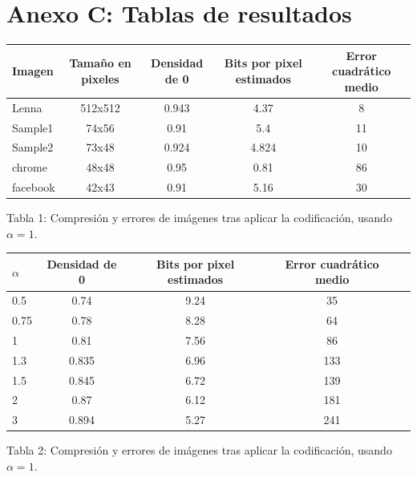 \documentclass[%
final,
%
reprint,
%
notitlepage,
narroweqnarray,
inline,
twoside,
invited
]{ieee}
\begin{document}

\section*{Anexo C: Tablas de resultados}

\begin{center}
	\begin{tabular}{|l || c | c | c | c|}
		\hline
		\textbf{Imagen} & \textbf{Tamaño en pixeles} & \textbf{Densidad de 0} & \textbf{Bits por pixel estimados} & \textbf{Error cuadrático medio}\\
		\hline
		\hline
		Lenna & 512x512 & 0.943 & 4.37 & 8\\
		Sample1 & 74x56 & 0.91 & 5.4 & 11\\
		Sample2 & 73x48 & 0.924 & 4.824 & 10\\
		chrome & 48x48 & 0.95 & 0.81 & 86\\
		facebook & 42x43 & 0.91 & 5.16 & 30\\
		\hline
	\end{tabular}
\end{center}
\begin{center}
Tabla 1: Compresión y errores de imágenes tras aplicar la codificación, usando $\alpha=1$.
\end{center}

\begin{center}
	\begin{tabular}{|l || c | c | c | c|}
		\hline
		\textbf{$\alpha$} & \textbf{Densidad de 0} & \textbf{Bits por pixel estimados} & \textbf{Error cuadrático medio}\\
		\hline
		\hline
		0.5 & 0.74 & 9.24 & 35\\
		0.75 & 0.78 & 8.28 & 64\\
		1 & 0.81 & 7.56 & 86\\
		1.3 & 0.835 & 6.96 & 133\\
		1.5 & 0.845 & 6.72 & 139\\
		2 & 0.87 & 6.12 & 181\\
		3 & 0.894 & 5.27 & 241\\
		\hline
	\end{tabular}
\end{center}
\begin{center}
Tabla 2: Compresión y errores de imágenes tras aplicar la codificación, usando $\alpha=1$.
\end{center}
\end{document}
